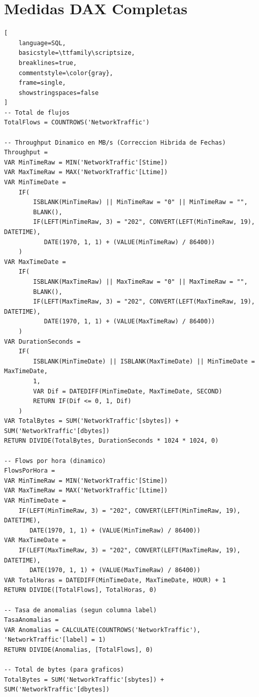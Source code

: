 \documentclass[conference]{IEEEtran}
\begin{document}
\appendices
\section{Medidas DAX Completas}
\label{appendix:dax}

\begin{lstlisting}[
    language=SQL,
    basicstyle=\ttfamily\scriptsize,
    breaklines=true,
    commentstyle=\color{gray},
    frame=single,
    showstringspaces=false
]
-- Total de flujos
TotalFlows = COUNTROWS('NetworkTraffic')

-- Throughput Dinamico en MB/s (Correccion Hibrida de Fechas)
Throughput = 
VAR MinTimeRaw = MIN('NetworkTraffic'[Stime])
VAR MaxTimeRaw = MAX('NetworkTraffic'[Ltime])
VAR MinTimeDate = 
    IF(
        ISBLANK(MinTimeRaw) || MinTimeRaw = "0" || MinTimeRaw = "", 
        BLANK(),
        IF(LEFT(MinTimeRaw, 3) = "202", CONVERT(LEFT(MinTimeRaw, 19), DATETIME), 
           DATE(1970, 1, 1) + (VALUE(MinTimeRaw) / 86400))
    )
VAR MaxTimeDate = 
    IF(
        ISBLANK(MaxTimeRaw) || MaxTimeRaw = "0" || MaxTimeRaw = "", 
        BLANK(),
        IF(LEFT(MaxTimeRaw, 3) = "202", CONVERT(LEFT(MaxTimeRaw, 19), DATETIME), 
           DATE(1970, 1, 1) + (VALUE(MaxTimeRaw) / 86400))
    )
VAR DurationSeconds = 
    IF(
        ISBLANK(MinTimeDate) || ISBLANK(MaxTimeDate) || MinTimeDate = MaxTimeDate, 
        1, 
        VAR Dif = DATEDIFF(MinTimeDate, MaxTimeDate, SECOND)
        RETURN IF(Dif <= 0, 1, Dif)
    )
VAR TotalBytes = SUM('NetworkTraffic'[sbytes]) + SUM('NetworkTraffic'[dbytes])
RETURN DIVIDE(TotalBytes, DurationSeconds * 1024 * 1024, 0)

-- Flows por hora (dinamico)
FlowsPorHora = 
VAR MinTimeRaw = MIN('NetworkTraffic'[Stime])
VAR MaxTimeRaw = MAX('NetworkTraffic'[Ltime])
VAR MinTimeDate = 
    IF(LEFT(MinTimeRaw, 3) = "202", CONVERT(LEFT(MinTimeRaw, 19), DATETIME), 
       DATE(1970, 1, 1) + (VALUE(MinTimeRaw) / 86400))
VAR MaxTimeDate = 
    IF(LEFT(MaxTimeRaw, 3) = "202", CONVERT(LEFT(MaxTimeRaw, 19), DATETIME), 
       DATE(1970, 1, 1) + (VALUE(MaxTimeRaw) / 86400))
VAR TotalHoras = DATEDIFF(MinTimeDate, MaxTimeDate, HOUR) + 1
RETURN DIVIDE([TotalFlows], TotalHoras, 0)

-- Tasa de anomalias (segun columna label)
TasaAnomalias = 
VAR Anomalias = CALCULATE(COUNTROWS('NetworkTraffic'), 'NetworkTraffic'[label] = 1)
RETURN DIVIDE(Anomalias, [TotalFlows], 0)

-- Total de bytes (para graficos)
TotalBytes = SUM('NetworkTraffic'[sbytes]) + SUM('NetworkTraffic'[dbytes])
\end{lstlisting}
\end{document}
